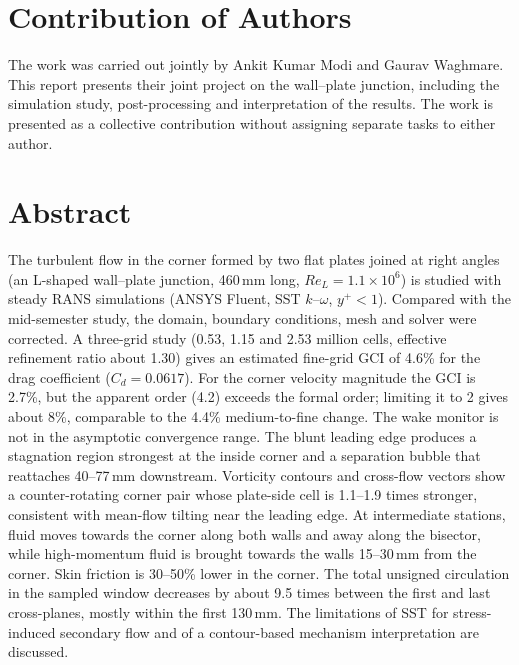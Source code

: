\documentclass[12pt,a4paper,oneside]{report}
\newcommand{\Cd}{C_d}
\begin{document}
\chapter*{Contribution of Authors}
\thispagestyle{plain}
The work was carried out jointly by Ankit Kumar Modi and Gaurav Waghmare. This report presents their joint project on the wall--plate junction, including the simulation study, post-processing and interpretation of the results. The work is presented as a collective contribution without assigning separate tasks to either author.

\chapter*{Abstract}
\thispagestyle{plain}
The turbulent flow in the corner formed by two flat plates joined at right angles (an L-shaped wall--plate junction, 460\,mm long, $Re_L = 1.1\times10^{6}$) is studied with steady RANS simulations (ANSYS Fluent, SST $k$--$\omega$, $y^+<1$). Compared with the mid-semester study, the domain, boundary conditions, mesh and solver were corrected. A three-grid study (0.53, 1.15 and 2.53 million cells, effective refinement ratio about 1.30) gives an estimated fine-grid GCI of 4.6\% for the drag coefficient ($\Cd = 0.0617$). For the corner velocity magnitude the GCI is 2.7\%, but the apparent order (4.2) exceeds the formal order; limiting it to 2 gives about 8\%, comparable to the 4.4\% medium-to-fine change. The wake monitor is not in the asymptotic convergence range. The blunt leading edge produces a stagnation region strongest at the inside corner and a separation bubble that reattaches 40--77\,mm downstream. Vorticity contours and cross-flow vectors show a counter-rotating corner pair whose plate-side cell is 1.1--1.9 times stronger, consistent with mean-flow tilting near the leading edge. At intermediate stations, fluid moves towards the corner along both walls and away along the bisector, while high-momentum fluid is brought towards the walls 15--30\,mm from the corner. Skin friction is 30--50\% lower in the corner. The total unsigned circulation in the sampled window decreases by about 9.5 times between the first and last cross-planes, mostly within the first 130\,mm. The limitations of SST for stress-induced secondary flow and of a contour-based mechanism interpretation are discussed.

{\setlength{\parskip}{2pt}
\tableofcontents
\thispagestyle{plain}
\listoftables
\thispagestyle{plain}
\listoffigures
\thispagestyle{plain}
}
\end{document}
